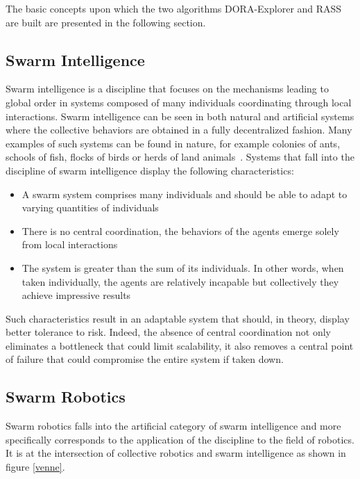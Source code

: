 The basic concepts upon which the two algorithms DORA-Explorer and RASS are built are presented in the following section. 

\subsection{Swarm Intelligence}
Swarm intelligence is a discipline that focuses on the mechanisms leading to global order in systems composed of many individuals coordinating through local interactions. Swarm intelligence can be seen in both natural and artificial systems where the collective behaviors are obtained in a fully decentralized fashion. Many examples of such systems can be found in nature, for example colonies of ants, schools of fish, flocks of birds or herds of land animals~\cite{Dorigo:2007}. Systems that fall into the discipline of swarm intelligence display the following characteristics: 

\begin{itemize}
    \item A swarm system comprises many individuals and should be able to adapt to varying quantities of individuals
    \item There is no central coordination, the behaviors of the agents emerge solely from local interactions
    \item The system is greater than the sum of its individuals. In other words, when taken individually, the agents are relatively incapable but collectively they achieve impressive results   
\end{itemize}

Such characteristics result in an adaptable system that should, in theory, display better tolerance to risk. Indeed, the absence of central coordination not only eliminates a bottleneck that could limit scalability, it also removes a central point of failure that could compromise the entire system if taken down.

\subsection{Swarm Robotics}
\label{sec:designprinciples}
Swarm robotics falls into the artificial category of swarm intelligence and more specifically corresponds to the application of the discipline to the field of robotics. It is at the intersection of collective robotics and swarm intelligence as shown in figure \ref{venne}. 

